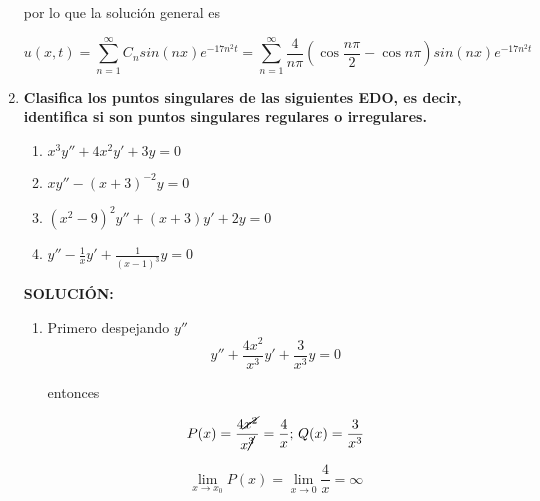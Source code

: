 \documentclass[12pt,a4paper]{article}
\begin{document}
\begin{enumerate}
    por lo que la solución general es
    
    \begin{equation*}
        u(x,t) =  \sum_{n = 1}^{\infty} C_n sin{(nx)} e^{-17n^2 t}= \sum_{n = 1}^{\infty}\frac{4}{n\pi} (\cos{\frac{n\pi}{2}}-\cos{n \pi}) sin{(nx)} e^{-17n^2 t}
    \end{equation*}
    
    
    
    
    
    
    
    
    



    \item \textbf{Clasifica los puntos singulares de las siguientes EDO, es decir, identifica si son puntos singulares regulares o irregulares.}
    
    \begin{enumerate}
        \item $x^3 y'' + 4x^2 y' + 3y = 0$
        
        \item $xy'' - (x+3)^{-2} y = 0$
        
        \item $(x^2 - 9)^2 y'' + (x + 3) y' + 2y = 0$
        
        \item $y'' - \frac{1}{x}y' + \frac{1}{(x-1)^3}y = 0$
    \end{enumerate}
    
    \textbf{SOLUCIÓN:}
    
    \begin{enumerate}
        \item Primero despejando $y''$
        \begin{equation*}
            y'' + \frac{4 x^2}{x^3} y' + \frac{3}{x^3} y =0
        \end{equation*}
        
        entonces
        
        \begin{equation*}
            P(x) = \frac{4 \cancel{x^2}}{x\cancel{^3}} = \frac{4}{x} \text{;    } Q(x) = \frac{3}{x^3}
        \end{equation*}
        
        \begin{equation*}
            \lim_{x \rightarrow x_0}P(x) = \lim_{x \rightarrow 0} \frac{4}{x} = \infty
        \end{equation*}
        

\end{enumerate}
\end{enumerate}
\end{document}
